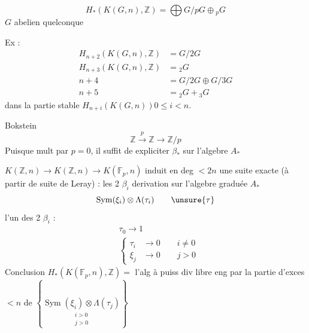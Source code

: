 \[
H_*(K(G,n),\mathbb Z)=\bigoplus G/pG\oplus {}_pG
\]
$G$ abelien quelconque

Ex :
\[
\left.\begin{aligned}
H_{n+2}(K(G,n),\mathbb Z)&=G/2G\\
H_{n+3}(K(G,n),\mathbb Z)&={}_2G\\
n+4\qquad &=G/2G\oplus G/3G\\
n+5\qquad &={}_2G+{}_3G
\end{aligned}\right.
\]
dans la partie stable $H_{n+i}(K(G,n))$\quad $0\leq i<n$.

Bokstein
\[
\mathbb Z\xrightarrow{p}\mathbb Z\longrightarrow\mathbb Z/p
\]
Puisque mult par $p=0$, il suffit de  expliciter $\beta_*$ sur l'algebre $A_*$

 $K(\mathbb Z,n)\longrightarrow K(\mathbb Z,n)\longrightarrow K(\mathbb F_p,n)$ induit en deg $<2n$ une suite exacte (à partir de suite de Leray) :
les 2 $\beta_i$   derivation sur l'algebre graduée $A_*$
\[
\operatorname{Sym}(\xi_i)\otimes\Lambda(\tau_i)\qquad\unsure{\tau}
\]
l'un des 2 $\beta_i$ :
\[
\begin{aligned}
&\tau_0\longrightarrow1\\
&\left\{\begin{aligned}\tau_i&\longrightarrow0\qquad i\ne0\\
\xi_j&\longrightarrow0\qquad j>0\end{aligned}\right.
\end{aligned}
\]
Conclusion \quad $H_*(K(\mathbb F_p,n),\mathbb Z)={}$  l'alg à puiss div libre eng par la partie d'exces $<n$ de
$\left\{\underset{\substack{i>0\\j>0}}{\operatorname{Sym}(\xi_i)\otimes\Lambda(\tau_j)}\right\}$

